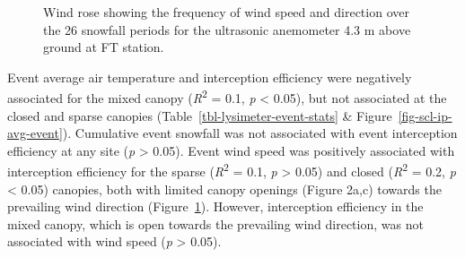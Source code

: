 \documentclass[
  letterpaper,
  DIV=11,
  numbers=noendperiod]{scrartcl}
\begin{document}

\begin{figure}


\caption{\label{fig-wind-rose}Wind rose showing the frequency of wind
speed and direction over the 26 snowfall periods for the ultrasonic
anemometer 4.3 m above ground at FT station.}

\end{figure}%

Event average air temperature and interception efficiency were
negatively associated for the mixed canopy (\emph{R}\textsuperscript{2}
= 0.1, \emph{p} \textless{} 0.05), but not associated at the closed and
sparse canopies (Table~\ref{tbl-lysimeter-event-stats} \&
Figure~\ref{fig-scl-ip-avg-event}). Cumulative event snowfall was not
associated with event interception efficiency at any site (\emph{p}
\textgreater{} 0.05). Event wind speed was positively associated with
interception efficiency for the sparse (\emph{R}\textsuperscript{2} =
0.1, \emph{p} \textgreater{} 0.05) and closed
(\emph{R}\textsuperscript{2} = 0.2, \emph{p} \textless{} 0.05) canopies,
both with limited canopy openings (Figure 2a,c) towards the prevailing
wind direction (Figure~\ref{fig-wind-rose}). However, interception
efficiency in the mixed canopy, which is open towards the prevailing
wind direction, was not associated with wind speed (\emph{p}
\textgreater{} 0.05).
\end{document}
